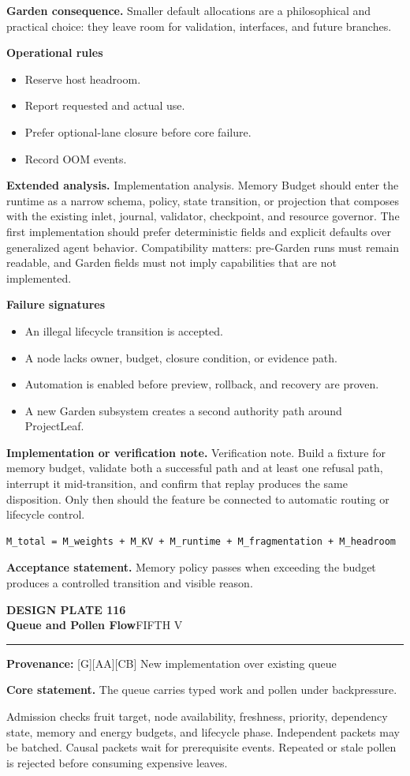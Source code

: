 \documentclass[10pt,letterpaper,oneside]{article}
\newcommand{\prov}[1]{\textcolor{gardenBlue}{\sffamily\footnotesize\textbf{Provenance:} #1}}
\newcommand{\platetitle}[3]{%
  \begin{minipage}[t][0.54in][t]{\textwidth}
  {\sffamily\bfseries\color{gardenDeep}\fontsize{9}{10}\selectfont DESIGN PLATE #1}\\[-1pt]
  {\sffamily\bfseries\color{gardenInk}\fontsize{16.5}{18}\selectfont #2}\hfill{\sffamily\color{gardenGreen}\large #3}
  \end{minipage}\vspace{-2pt}\hrule\vspace{5pt}}
\begin{document}
\textbf{Garden consequence.} Smaller default allocations are a philosophical and practical choice: they leave room for validation, interfaces, and future branches.

\textbf{Operational rules}
\begin{itemize}
\item Reserve host headroom.
\item Report requested and actual use.
\item Prefer optional-lane closure before core failure.
\item Record OOM events.
\end{itemize}
\textbf{Extended analysis.} Implementation analysis. Memory Budget should enter the runtime as a narrow schema, policy, state transition, or projection that composes with the existing inlet, journal, validator, checkpoint, and resource governor. The first implementation should prefer deterministic fields and explicit defaults over generalized agent behavior. Compatibility matters: pre-Garden runs must remain readable, and Garden fields must not imply capabilities that are not implemented.

\textbf{Failure signatures}
\begin{itemize}
\item An illegal lifecycle transition is accepted.
\item A node lacks owner, budget, closure condition, or evidence path.
\item Automation is enabled before preview, rollback, and recovery are proven.
\item A new Garden subsystem creates a second authority path around ProjectLeaf.
\end{itemize}
\textbf{Implementation or verification note.} Verification note. Build a fixture for memory budget, validate both a successful path and at least one refusal path, interrupt it mid-transition, and confirm that replay produces the same disposition. Only then should the feature be connected to automatic routing or lifecycle control.

\begin{lstlisting}
M_total = M_weights + M_KV + M_runtime + M_fragmentation + M_headroom
\end{lstlisting}
\begin{acceptbox}
\textbf{Acceptance statement.} Memory policy passes when exceeding the budget produces a controlled transition and visible reason.
\end{acceptbox}
\newpage
\platetitle{116}{Queue and Pollen Flow}{FIFTH V}
\prov{[G][AA][CB] New implementation over existing queue}
\fontsize{8.85}{10.45}\selectfont
\begin{corebox}
\textbf{Core statement.} The queue carries typed work and pollen under backpressure.
\end{corebox}
Admission checks fruit target, node availability, freshness, priority, dependency state, memory and energy budgets, and lifecycle phase. Independent packets may be batched. Causal packets wait for prerequisite events. Repeated or stale pollen is rejected before consuming expensive leaves.
\end{document}
